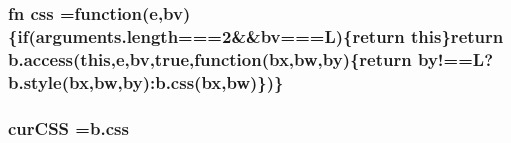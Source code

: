 \subsubsection[{css}]{ fn css =function(e,bv)\{{\bf if}(arguments.\-length===2\&\&bv==={\bf L})\{return this\}return b.\-access(this,e,bv,true,function(bx,bw,by)\{return by!=={\bf L}?b.\-style(bx,bw,by)\-:b.\-css(bx,bw)\})\}}\label{html_2jquery_8js_a89ad527fcd82c01ebb587332f5b4fcd4}
\subsubsection[{cur\-C\-S\-S}]{ cur\-C\-S\-S ={\bf b.\-css}}\label{html_2jquery_8js_a88b21f8ba3af86d6981b1da520ece33b}
